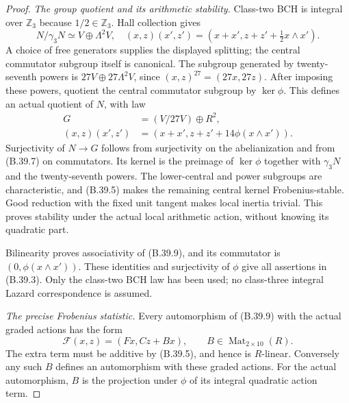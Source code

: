 \begin{proof}
\emph{The group quotient and its arithmetic stability.}
Class-two BCH is integral over $\mathbb Z_3$ because
$1/2\in\mathbb Z_3$. Hall collection gives
\[
 N/\gamma_3N\simeq V\oplus\Lambda^2V,
 \quad
 (x,z)(x',z')=(x+x',z+z'+\tfrac12x\wedge x').
                                                               \tag{B.39.8}
\]
A choice of free generators supplies the displayed
splitting; the central commutator subgroup itself is
canonical. The subgroup generated by twenty-seventh
powers is $27V\oplus27\Lambda^2V$, since
$(x,z)^{27}=(27x,27z)$.
After imposing these powers, quotient the central
commutator subgroup by $\ker\phi$.
This defines an actual quotient of $N$, with law
\[
 \begin{split}
 G&=(V/27V)\oplus R^2,\\
 (x,z)(x',z')&=
 (x+x',z+z'+14\phi(x\wedge x')).
 \end{split}                                                  \tag{B.39.9}
\]
Surjectivity of $N\to G$ follows from surjectivity on
the abelianization and from (B.39.7) on commutators.
Its kernel is the preimage of $\ker\phi$ together
with $\gamma_3N$ and the twenty-seventh powers.
The lower-central and power subgroups are
characteristic, and (B.39.5) makes the remaining
central kernel Frobenius-stable.
Good reduction with the fixed unit tangent makes
local inertia trivial. This proves stability under
the actual local arithmetic action, without knowing
its quadratic part.

Bilinearity proves associativity of (B.39.9), and
its commutator is $(0,\phi(x\wedge x'))$.
These identities and surjectivity of $\phi$ give
all assertions in (B.39.3).
Only the class-two BCH law has been used; no
class-three integral Lazard correspondence is assumed.

\emph{The precise Frobenius statistic.}
Every automorphism of (B.39.9) with the actual
graded actions has the form
\[
            \mathcal F(x,z)=(Fx,Cz+Bx),
       \qquad B\in\operatorname{Mat}_{2\times10}(R).
                                                               \tag{B.39.10}
\]
The extra term must be additive by (B.39.5), and
hence is $R$-linear. Conversely any such $B$ defines
an automorphism with these graded actions.
For the actual automorphism, $B$ is the projection
under $\phi$ of its integral quadratic action term.


\end{proof}

